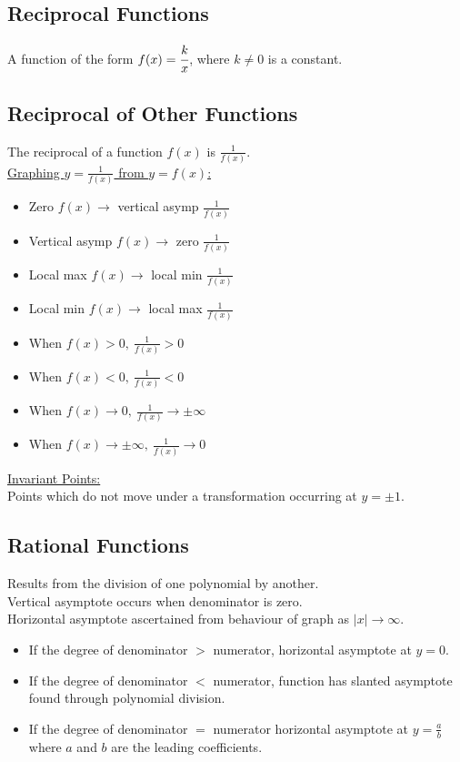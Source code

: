 \documentclass[10pt, a4paper, titlepage]{article}
\begin{document}
\begin{multicols*}{3}
	\subsection{Reciprocal Functions}
	A function of the form $f(x)=\cfrac{k}{x}$, where $k\neq 0$ is a constant.

	\dotfill
	\subsection{Reciprocal of Other Functions}
	The reciprocal of a function $f(x)$ is $\frac{1}{f(x)}$.\\
	\underline{Graphing $y=\frac{1}{f(x)}$ from $y=f(x)$:}
	\begin{itemize}
		\item Zero $f(x)\to$ vertical asymp $\frac{1}{f(x)}$
		\item Vertical asymp $f(x)\to$ zero $\frac{1}{f(x)}$
		\item Local max $f(x)\to$ local min $\frac{1}{f(x)}$
		\item Local min $f(x)\to$ local max $\frac{1}{f(x)}$
		\item When $f(x)>0,\ \frac{1}{f(x)}>0$
		\item When $f(x)<0,\ \frac{1}{f(x)}<0$
		\item When $f(x)\to 0,\ \frac{1}{f(x)}\to \pm \infty$
		\item When $f(x)\to \pm \infty,\ \frac{1}{f(x)}\to 0$
	\end{itemize}
	\underline{Invariant Points:}
	\\Points which do not move under a transformation occurring at $y=\pm 1$.

	\dotfill
	\subsection{Rational Functions}
	Results from the division of one polynomial by another.\\
	Vertical asymptote occurs when denominator is zero.\\
	Horizontal asymptote ascertained from behaviour of graph as $|x|\to \infty$.
	\begin{itemize}
		\item If the degree of denominator $>$ numerator, horizontal asymptote at $y=0$.
		\item If the degree of denominator $<$ numerator, function has slanted asymptote found through polynomial division.
		\item If the degree of denominator $=$ numerator horizontal asymptote at $y=\frac{a}{b}$ where $a$ and $b$ are the leading coefficients.
	\end{itemize}


\end{multicols*}
\end{document}
